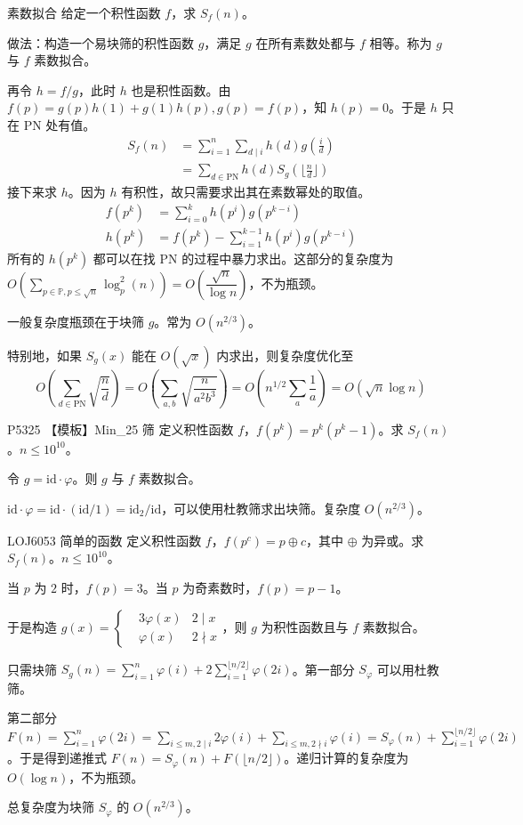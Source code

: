 \documentclass [hyperref={bookmarksdepth=4}, aspectratio=169] {beamer}
\theoremstyle {fy}
\begin{document}
\begin{frame}{素数拟合}
给定一个积性函数 $f$，求 $S_f(n)$。

做法：构造一个易块筛的积性函数 $g$，满足 $g$ 在所有素数处都与 $f$ 相等。称为 $g$ 与 $f$ 素数拟合。

再令 $h=f/g$，此时 $h$ 也是积性函数。由 $f(p)=g(p)h(1)+g(1)h(p),g(p)=f(p)$，知 $h(p)=0$。于是 $h$ 只在 PN 处有值。
$$
\begin{aligned}
S_f(n)&=\sum_{i=1}^n\sum_{d\mid i}h(d)g(\frac{i}{d})\\
&=\sum_{d\in \text{PN}}h(d)S_g(\lfloor\frac{n}{d}\rfloor)
\end{aligned}
$$
接下来求 $h$。因为 $h$ 有积性，故只需要求出其在素数幂处的取值。
$$
\begin{aligned}
f(p^k)&=\sum_{i=0}^kh(p^i)g(p^{k-i})\\
h(p^k)&=f(p^k)-\sum_{i=1}^{k-1}h(p^i)g(p^{k-i})
\end{aligned}
$$
所有的 $h(p^k)$ 都可以在找 PN 的过程中暴力求出。这部分的复杂度为 $O(\sum\limits_{p\in\mathbb{P},p\le \sqrt n}\log_p^2(n))=O(\dfrac{\sqrt n}{\log n})$，不为瓶颈。

一般复杂度瓶颈在于块筛 $g$。常为 $O(n^{2/3})$。

特别地，如果 $S_g(x)$ 能在 $O(\sqrt x)$ 内求出，则复杂度优化至
$$
O(\sum_{d\in\text{PN}}\sqrt{\frac{n}{d}})=O(\sum_{a,b}\sqrt{\frac{n}{a^2b^3}})=O(n^{1/2}\sum_a\frac{1}{a})=O(\sqrt n\log n)
$$
\end{frame}

\begin{frame}{P5325 【模板】Min\_25 筛}
定义积性函数 $f$，$f(p^k)=p^k(p^k-1)$。求 $S_f(n)$。$n\le 10^{10}$。

令 $g=\text{id}\cdot\varphi$。则 $g$ 与 $f$ 素数拟合。

$\text{id}\cdot\varphi=\text{id}\cdot(\text{id}/1)=\text{id}_2/\text{id}$，可以使用杜教筛求出块筛。复杂度 $O(n^{2/3})$。
\end{frame}

\begin{frame}{LOJ6053 简单的函数}
定义积性函数 $f$，$f(p^c)=p\oplus c$，其中 $\oplus$ 为异或。求 $S_f(n)$。$n\le10^{10}$。

当 $p$ 为 $2$ 时，$f(p)=3$。当 $p$ 为奇素数时，$f(p)=p-1$。

于是构造 $g(x)=\left\{\begin{aligned}&3\varphi(x) & 2\mid x\\ &\varphi(x) & 2\nmid x\end{aligned}\right.$，则 $g$ 为积性函数且与 $f$ 素数拟合。

只需块筛 $S_g(n)=\sum\limits_{i=1}^n\varphi(i)+2\sum\limits_{i=1}^{\lfloor n/2\rfloor}\varphi(2i)$。第一部分 $S_{\varphi}$ 可以用杜教筛。

第二部分 $F(n)=\sum\limits_{i=1}^n\varphi(2i)=\sum\limits_{i\le m,2\mid i}2\varphi(i)+\sum\limits_{i\le m,2\nmid i}\varphi(i)=S_{\varphi}(n)+\sum\limits_{i=1}^{\lfloor n/2\rfloor}\varphi(2i)$。于是得到递推式 $F(n)=S_{\varphi}(n)+F(\lfloor n/2\rfloor)$。递归计算的复杂度为 $O(\log n)$，不为瓶颈。

总复杂度为块筛 $S_{\varphi}$ 的 $O(n^{2/3})$。
\end{frame}
\end{document}
